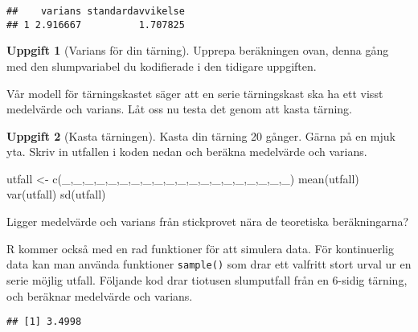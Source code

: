 \documentclass[
]{book}
\newenvironment{Shaded}{\begin{snugshade}}{\end{snugshade}}
\newcommand{\AttributeTok}[1]{\textcolor[rgb]{0.77,0.63,0.00}{#1}}
\newcommand{\DecValTok}[1]{\textcolor[rgb]{0.00,0.00,0.81}{#1}}
\newcommand{\FunctionTok}[1]{\textcolor[rgb]{0.00,0.00,0.00}{#1}}
\newcommand{\NormalTok}[1]{#1}
\newcommand{\OtherTok}[1]{\textcolor[rgb]{0.56,0.35,0.01}{#1}}
\newcommand{\SpecialCharTok}[1]{\textcolor[rgb]{0.00,0.00,0.00}{#1}}
\theoremstyle{definition}
\theoremstyle{definition}
\theoremstyle{definition}
\newtheorem{exercise}{Uppgift}[chapter]
\theoremstyle{definition}
\theoremstyle{remark}
\begin{document}
\begin{verbatim}
##    varians standardavvikelse
## 1 2.916667          1.707825
\end{verbatim}

\begin{exercise}[Varians för din tärning]
Upprepa beräkningen ovan, denna gång med den slumpvariabel du kodifierade i den tidigare uppgiften.
\end{exercise}

Vår modell för tärningskastet säger att en serie tärningskast ska ha ett visst medelvärde och varians. Låt oss nu testa det genom att kasta tärning.

\begin{exercise}[Kasta tärningen]
Kasta din tärning 20 gånger. Gärna på en mjuk yta. Skriv in utfallen i koden nedan och beräkna medelvärde och varians.

\begin{Shaded}
\begin{Highlighting}[]
\NormalTok{utfall }\OtherTok{\textless{}{-}} \FunctionTok{c}\NormalTok{(\_,\_,\_,\_,\_,\_,\_,\_,\_,\_,\_,\_,\_,\_,\_,\_,\_,\_,\_,\_)}
\FunctionTok{mean}\NormalTok{(utfall)}
\FunctionTok{var}\NormalTok{(utfall)}
\FunctionTok{sd}\NormalTok{(utfall)}
\end{Highlighting}
\end{Shaded}

Ligger medelvärde och varians från stickprovet nära de teoretiska beräkningarna?
\end{exercise}

R kommer också med en rad funktioner för att simulera data. För kontinuerlig data kan man använda funktioner \texttt{sample()} som drar ett valfritt stort urval ur en serie möjlig utfall. Följande kod drar tiotusen slumputfall från en 6-sidig tärning, och beräknar medelvärde och varians.

\begin{Shaded}
\end{Shaded}

\begin{verbatim}
## [1] 3.4998
\end{verbatim}
\end{document}
